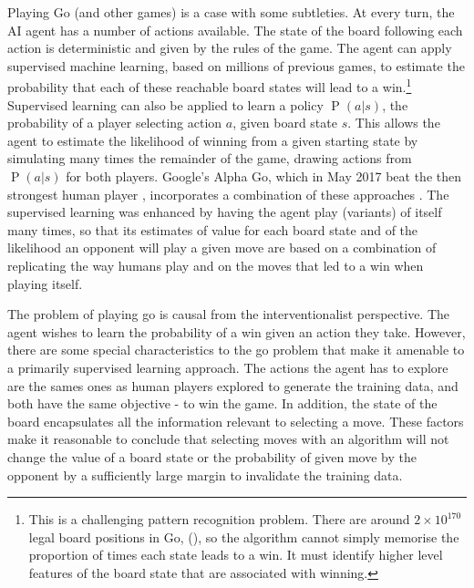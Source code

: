 \documentclass[11pt,a4paper,twoside]{report}
\renewcommand{\P}[1]{\operatorname{P}\left(#1\right)}
\theoremstyle{plain}
\theoremstyle{definition}
\begin{document}
Playing Go (and other games) is a case with some subtleties. At every turn, the AI agent has a number of actions available. The state of the board following each action is deterministic and given by the rules of the game. The agent can apply supervised machine learning, based on millions of previous games, to estimate the probability that each of these reachable board states will lead to a win.\footnote{This is a challenging pattern recognition problem. There are around $2 \times 10^{170}$ legal board positions in Go, (\citep{tromp2016number}), so the algorithm cannot simply memorise the proportion of times each state leads to a win. It must identify higher level features of the board state that are associated with winning.} Supervised learning can also be applied to learn a policy $\P{a|s}$, the probability of a player selecting action $a$, given board state $s$. This allows the agent to estimate the likelihood of winning from a given starting state by simulating many times the remainder of the game, drawing actions from $\P{a|s}$ for both players. Google's Alpha Go, which in May 2017 beat the then strongest human player \citep{Mozur2017}, incorporates a combination of these approaches \citep{silver2016mastering}. The supervised learning was enhanced by having the agent play (variants) of itself many times, so that its estimates of value for each board state and of the likelihood an opponent will play a given move are based on a combination of replicating the way humans play and on the moves that led to a win when playing itself. 

The problem of playing go is causal from the interventionalist perspective. The agent wishes to learn the probability of a win given an action they take. However, there are some special characteristics to the go problem that make it amenable to a primarily supervised learning approach. The actions the agent has to explore are the sames ones as human players explored to generate the training data, and both have the same objective - to win the game. In addition, the state of the board encapsulates all the information relevant to selecting a move. These factors make it reasonable to conclude that selecting moves with an algorithm will not change the value of a board state or the probability of given move by the opponent by a sufficiently large margin to invalidate the training data. 
 
\end{document}

